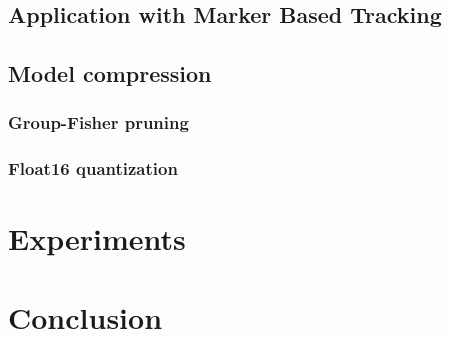 \section{Application with Marker Based Tracking}


\section{Model compression}

\subsection{Group-Fisher pruning}

\subsection{Float16 quantization}


\chapter{Experiments}


\chapter{Conclusion}
\label{zaver}




% 